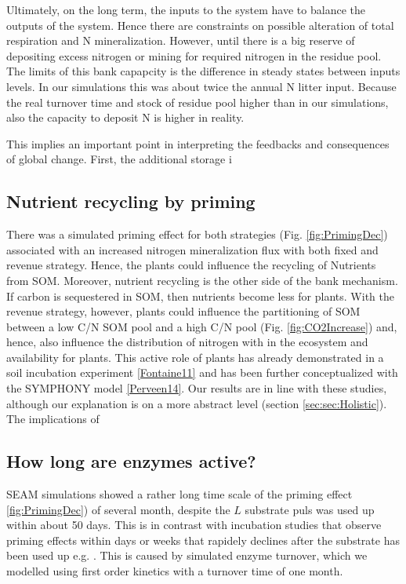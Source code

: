 Ultimately, on the long term, the inputs to the system have to balance the
outputs of the system. Hence there are constraints on possible alteration of
total respiration and N mineralization. However, until there is a big reserve of
depositing excess nitrogen or mining for required nitrogen in the residue pool.
The limits of this bank capapcity is the difference in steady states between
inputs levels. In our simulations this was about twice the annual N
litter input. Because the real turnover time and stock of residue pool higher
than in our simulations, also the capacity to deposit N is higher in reality.

This implies an important point in interpreting the feedbacks and consequences
of global change.  First, the additional storage i

\subsection{Nutrient recycling by priming}
There was a simulated priming effect for both strategies (Fig.
\ref{fig:PrimingDec}) associated with an increased nitrogen mineralization flux
with both fixed and revenue strategy. Hence, the plants could influence the
recycling of Nutrients from SOM. Moreover, nutrient recycling is the other side
of the bank mechanism. If carbon is sequestered in SOM, then nutrients become
less for plants. With the revenue strategy, however, plants could influence the
partitioning of SOM between a low C/N SOM pool and a high C/N pool (Fig.
\ref{fig:CO2Increase}) and, hence, also influence the distribution of nitrogen
with in the ecosystem and availability for plants. This active role of plants
has already demonstrated in a soil incubation experiment \ref{Fontaine11} and
has been further conceptualized with the SYMPHONY model \ref{Perveen14}. Our
results are in line with these studies, although our explanation is on a more abstract
level (section \ref{sec:sec:Holistic}). The implications of 

\subsection{How long are enzymes active?}
SEAM simulations showed a rather long time scale of the priming effect
\ref{fig:PrimingDec}) of several month, despite the $L$ substrate puls was used
up within about 50 days. This is in contrast with incubation studies that
observe priming effects within days or weeks that rapidely declines after the
substrate has been used up e.g. \citep{Blagodatskaya14}.
This is caused by simulated enzyme turnover, which we modelled using first
order kinetics with a turnover time of one month. \citep{XXBurnsEnzymeReview}

